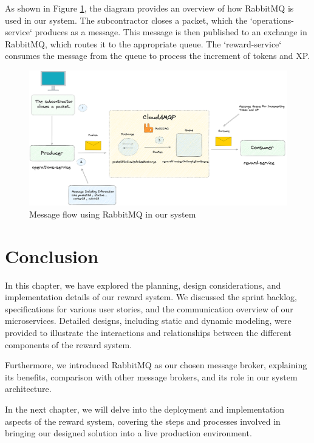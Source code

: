 As shown in Figure \ref{fig:rabbitmq-diagram}, the diagram provides an overview of how RabbitMQ is used in our system. The subcontractor closes a packet, which the `operations-service` produces as a message. This message is then published to an exchange in RabbitMQ, which routes it to the appropriate queue. The `reward-service` consumes the message from the queue to process the increment of tokens and XP.

\begin{figure}[H]
    \centering
    \includegraphics[width=\linewidth]{src/assets/diagrams/RabbitMqExplanation.png}
    \caption{Message flow using RabbitMQ in our system}
    \label{fig:rabbitmq-diagram}
\end{figure}


\section{Conclusion}
In this chapter, we have explored the planning, design considerations, and implementation details of our reward system. We discussed the sprint backlog, specifications for various user stories, and the communication overview of our microservices. Detailed designs, including static and dynamic modeling, were provided to illustrate the interactions and relationships between the different components of the reward system. 

Furthermore, we introduced RabbitMQ as our chosen message broker, explaining its benefits, comparison with other message brokers, and its role in our system architecture.

In the next chapter, we will delve into the deployment and implementation aspects of the reward system, covering the steps and processes involved in bringing our designed solution into a live production environment.


 